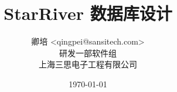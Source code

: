\title{\textbf{StarRiver 数据库设计}}

\author{卿培 <qingpei@sansitech.com> \\
        研发一部软件组\\
        上海三思电子工程有限公司
}

\date{\today}
